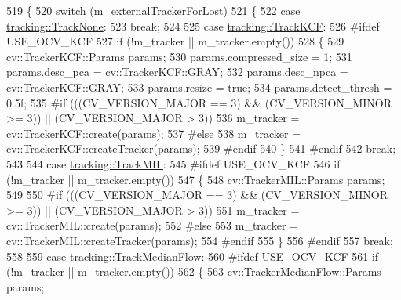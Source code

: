 \begin{DoxyCode}
519 \{
520     \textcolor{keywordflow}{switch} (\mbox{\hyperlink{class_c_track_a7d1f6c9d8d56790a28a7139e85896dc8}{m\_externalTrackerForLost}})
521     \{
522     \textcolor{keywordflow}{case} \mbox{\hyperlink{namespacetracking_a5377d69122ad915004ef68a518d22be3a3bd92892a83828375b9fce502732c491}{tracking::TrackNone}}:
523         \textcolor{keywordflow}{break};
524 
525     \textcolor{keywordflow}{case} \mbox{\hyperlink{namespacetracking_a5377d69122ad915004ef68a518d22be3a9bba8e4377e562caa976576d47c5eb2e}{tracking::TrackKCF}}:
526 \textcolor{preprocessor}{#ifdef USE\_OCV\_KCF}
527         \textcolor{keywordflow}{if} (!m\_tracker || m\_tracker.empty())
528         \{
529             cv::TrackerKCF::Params params;
530             params.compressed\_size = 1;
531             params.desc\_pca = cv::TrackerKCF::GRAY;
532             params.desc\_npca = cv::TrackerKCF::GRAY;
533             params.resize = \textcolor{keyword}{true};
534             params.detect\_thresh = 0.5f;
535 \textcolor{preprocessor}{#if (((CV\_VERSION\_MAJOR == 3) && (CV\_VERSION\_MINOR >= 3)) || (CV\_VERSION\_MAJOR > 3))}
536             m\_tracker = cv::TrackerKCF::create(params);
537 \textcolor{preprocessor}{#else}
538             m\_tracker = cv::TrackerKCF::createTracker(params);
539 \textcolor{preprocessor}{#endif}
540         \}
541 \textcolor{preprocessor}{#endif}
542         \textcolor{keywordflow}{break};
543 
544     \textcolor{keywordflow}{case} \mbox{\hyperlink{namespacetracking_a5377d69122ad915004ef68a518d22be3a98b9586c66bb9e4b1e0fed027700a197}{tracking::TrackMIL}}:
545 \textcolor{preprocessor}{#ifdef USE\_OCV\_KCF}
546         \textcolor{keywordflow}{if} (!m\_tracker || m\_tracker.empty())
547         \{
548             cv::TrackerMIL::Params params;
549 
550 \textcolor{preprocessor}{#if (((CV\_VERSION\_MAJOR == 3) && (CV\_VERSION\_MINOR >= 3)) || (CV\_VERSION\_MAJOR > 3))}
551             m\_tracker = cv::TrackerMIL::create(params);
552 \textcolor{preprocessor}{#else}
553             m\_tracker = cv::TrackerMIL::createTracker(params);
554 \textcolor{preprocessor}{#endif}
555         \}
556 \textcolor{preprocessor}{#endif}
557         \textcolor{keywordflow}{break};
558 
559     \textcolor{keywordflow}{case} \mbox{\hyperlink{namespacetracking_a5377d69122ad915004ef68a518d22be3a637634260348d3b28ff4e28661bb417a}{tracking::TrackMedianFlow}}:
560 \textcolor{preprocessor}{#ifdef USE\_OCV\_KCF}
561         \textcolor{keywordflow}{if} (!m\_tracker || m\_tracker.empty())
562         \{
563             cv::TrackerMedianFlow::Params params;

\end{DoxyCode}
